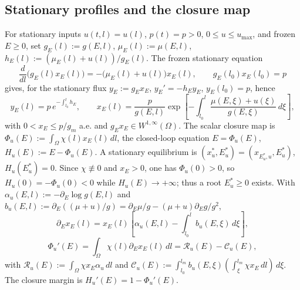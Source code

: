 \documentclass[a4paper,fleqn,longmktitle]{cas-sc}
\theoremstyle{plain}
\theoremstyle{definition}
\theoremstyle{remark}
\numberwithin{equation}{section}
\begin{document}
\subsection{Stationary profiles and the closure map}
\label{subsec:model_stationary_closure}
For stationary inputs \(u(t,l)=u(l)\), \(p(t)=p>0\), \(0\le u\le u_{\max}\), and
frozen \(E\ge0\), set \(g_E(l):=g(E,l)\), \(\mu_E(l):=\mu(E,l)\),
\(h_E(l):=(\mu_E(l)+u(l))/g_E(l)\). The frozen stationary equation
\[
    \frac{d}{dl}\big(g_E(l)x_E(l)\big)
    =
    -\big(\mu_E(l)+u(l)\big)x_E(l),
    \qquad
    g_E(l_0)x_E(l_0)=p
\]
gives, for the stationary flux \(y_E:=g_Ex_E\), \(y_E'=-h_Ey_E\),
\(y_E(l_0)=p\), hence
\begin{equation}
    \label{eq:model_xE}
    y_E(l)=p\,e^{-\int_{l_0}^l h_E},
    \qquad
    x_E(l)
    =
    \frac{p}{g(E,l)}
    \exp\!\left[
        -\int_{l_0}^{l}
        \frac{\mu(E,\xi)+u(\xi)}{g(E,\xi)}\,d\xi
    \right],
\end{equation}
with \(0<x_E\le p/g_m\) a.e. and \(g_Ex_E\in W^{1,\infty}(\Omega)\). The scalar
closure map is \(\Phi_u(E):=\int_\Omega\chi(l)x_E(l)\,dl\), the closed-loop
equation \(E=\Phi_u(E)\), \(H_u(E):=E-\Phi_u(E)\). A stationary equilibrium is
\((x_u^*,E_u^*)=(x_{E_u^*,u},E_u^*)\), \(H_u(E_u^*)=0\). Since \(\chi\not\equiv0\)
and \(x_E>0\), one has \(\Phi_u(0)>0\), so \(H_u(0)=-\Phi_u(0)<0\) while
\(H_u(E)\to+\infty\); thus a root \(E_u^*\ge0\) exists. With
\(\alpha_u(E,l):=-\partial_E\log g(E,l)\) and
\(b_u(E,l):=\partial_E((\mu+u)/g)
=\partial_E\mu/g-(\mu+u)\partial_Eg/g^2\),
\[
    \partial_E x_E(l)
    =
    x_E(l)
    \left[
        \alpha_u(E,l)
        -
        \int_{l_0}^{l}b_u(E,\xi)\,d\xi
    \right],
\]
\[
    \Phi_u'(E)
    =
    \int_\Omega\chi(l)\partial_E x_E(l)\,dl
    =
    \mathcal R_u(E)-\mathcal C_u(E),
\]
with \(\mathcal R_u(E):=\int_\Omega\chi x_E\alpha_u\,dl\) and
\(\mathcal C_u(E):=\int_{l_0}^{l_m}b_u(E,\xi)
(\int_{\xi}^{l_m}\chi x_E\,dl)\,d\xi\). The closure margin is
\(H_u'(E)=1-\Phi_u'(E)\).
\end{document}
